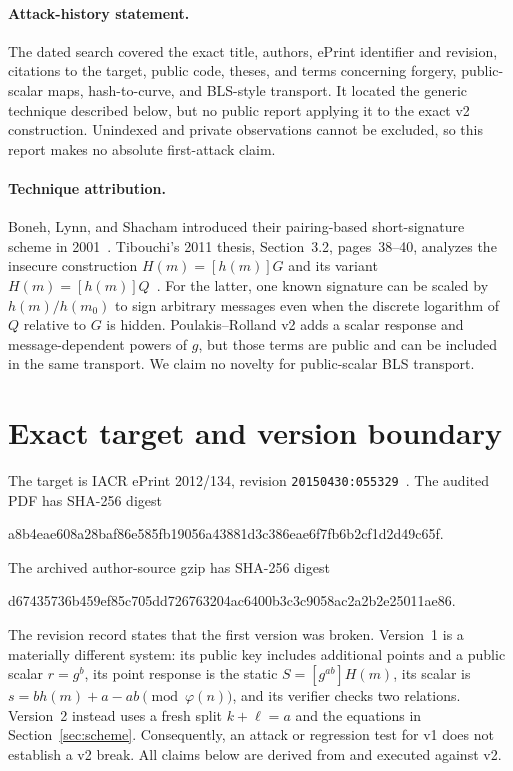 \documentclass[10pt,a4paper]{article}
\begin{document}
\paragraph{Attack-history statement.}
The dated search covered the exact title, authors, ePrint identifier and
revision, citations to the target, public code, theses, and terms concerning
forgery, public-scalar maps, hash-to-curve, and BLS-style transport.  It
located the generic technique described below, but no public report applying
it to the exact v2 construction.  Unindexed and private observations cannot be
excluded, so this report makes no absolute first-attack claim.

\paragraph{Technique attribution.}
Boneh, Lynn, and Shacham introduced their pairing-based short-signature
scheme in 2001~\cite{bls}.  Tibouchi's 2011 thesis, Section~3.2,
pages~38--40, analyzes the insecure construction $H(m)=[h(m)]G$ and its
variant $H(m)=[h(m)]Q$~\cite{tibouchi}.  For the latter, one known signature
can be scaled by $h(m)/h(m_0)$ to sign arbitrary messages even when the
discrete logarithm of $Q$ relative to $G$ is hidden.  Poulakis--Rolland v2
adds a scalar response and message-dependent powers of $g$, but those terms
are public and can be included in the same transport.  We claim no novelty
for public-scalar BLS transport.

\section{Exact target and version boundary}

The target is IACR ePrint 2012/134, revision
\texttt{20150430:055329}~\cite{poulakisrolland}.  The audited PDF has SHA-256
digest
\begin{center}
\small\ttfamily
a8b4eae608a28baf86e585fb19056a43881d3c386eae6f7fb6b2cf1d2d49c65f.
\end{center}
The archived author-source gzip has SHA-256 digest
\begin{center}
\small\ttfamily
d67435736b459ef85c705dd726763204ac6400b3c3c9058ac2a2b2e25011ae86.
\end{center}
The revision record states that the first version was broken.  Version~1 is a
materially different system: its public key includes additional points and a
public scalar $r=g^b$, its point response is the static
$S=[g^{ab}]H(m)$, its scalar is $s=bh(m)+a-ab\pmod{\varphi(n)}$, and its
verifier checks two relations.  Version~2 instead uses a fresh split
$k+\ell=a$ and the equations in Section~\ref{sec:scheme}.  Consequently, an
attack or regression test for v1 does not establish a v2 break.  All claims
below are derived from and executed against v2.
\end{document}
